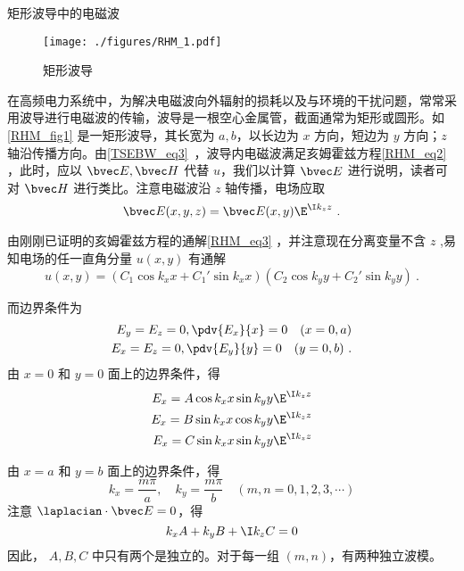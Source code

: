 \begin{example}{矩形波导中的电磁波}
\begin{figure}[ht]
\centering
\texttt{[image: ./figures/RHM\_1.pdf]}
\caption{矩形波导} \label{RHM_fig1}
\end{figure}
在高频电力系统中，为解决电磁波向外辐射的损耗以及与环境的干扰问题，常常采用波导进行电磁波的传输，波导是一根空心金属管，截面通常为矩形或圆形。如\autoref{RHM_fig1} 是一矩形波导，其长宽为 $a,b$，以长边为 $x$ 方向，短边为 $y$ 方向；$z$ 轴沿传播方向。由\autoref{TSEBW_eq3}~，波导内电磁波满足亥姆霍兹方程\autoref{RHM_eq2} ，此时，应以 $\bvec E,\bvec H$ 代替 $u$，我们以计算 $\bvec E$ 进行说明，读者可对 $\bvec H$ 进行类比。注意电磁波沿 $z$ 轴传播，电场应取
\begin{equation}
\bvec E(x,y,z)=\bvec E(x,y)\E^{\I k_z z}~.
\end{equation}

由刚刚已证明的亥姆霍兹方程的通解\autoref{RHM_eq3} ，并注意现在分离变量不含 $z$ ,易知电场的任一直角分量 $u(x,y)$ 有通解
\begin{equation}
u(x,y)=(C_1\cos k_xx+C_1'\sin k_xx)(C_2\cos k_yy+C_2'\sin k_yy)~.
\end{equation}

而边界条件为
\begin{equation}
\begin{aligned}
E_y=E_z=0,\pdv{E_x}{x}=0\quad(x=0,a)\\
E_x=E_z=0,\pdv{E_y}{y}=0\quad(y=0,b)~.
\end{aligned}
\end{equation}
由 $x=0$ 和 $y=0$ 面上的边界条件，得
\begin{equation}
\begin{aligned}
E_x=A\cos k_x x\sin k_yy\E^{\I k_zz} \\
E_x=B\sin k_x x\cos k_yy\E^{\I k_zz} \\
E_x=C\sin k_x x\sin k_yy\E^{\I k_zz}
\end{aligned}
\end{equation}
 
由 $x=a$ 和 $y=b$ 面上的边界条件，得 
\begin{equation}
k_x=\frac{m\pi}{a},\quad k_y=\frac{m\pi}{b}\quad(m,n=0,1,2,3,\cdots)
\end{equation}
注意 $\laplacian \cdot\bvec E=0$，得
\begin{equation}
k_xA+k_yB+\I k_zC=0
\end{equation}
因此， $A,B,C$ 中只有两个是独立的。对于每一组 $(m,n)$，有两种独立波模。
\end{example}
